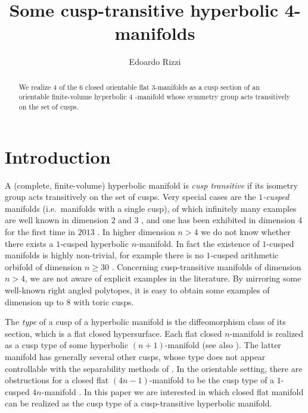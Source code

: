 \documentclass{amsart}
\author{Edoardo Rizzi}
\title{Some cusp-transitive hyperbolic 4-manifolds}
\theoremstyle{definition}
\theoremstyle{remark}
\begin{document}
\begin{abstract}
We realize 4 of the 6 closed orientable flat 3-manifolds as a cusp section of an orientable finite-volume hyperbolic 4
-manifold whose symmetry group acts transitively on the set of cusps.
\end{abstract}

\maketitle

\section{Introduction}

A (complete, finite-volume)
hyperbolic manifold is \emph{cusp transitive} if its isometry group acts transitively on the set of cusps. Very special cases are the \emph{$1$-cusped} manifolds (i.e.~manifolds with a single cusp), of which infinitely many examples are well known in dimension $2$ and $3$%
, and one has been exhibited in dimension 4 for the first time in $2013$ \cite{KM}. %
In higher dimension $n > 4$ we do not know whether there exists a $1$-cusped hyperbolic $n$-manifold. In fact the existence of $1$-cusped manifolds is highly non-trivial, for example there is no $1$-cusped arithmetic orbifold of dimension $n\ge 30$ \cite{MR3070517}. Concerning cusp-transitive manifolds of dimension $n>4$, we are not aware of explicit examples in the literature. By mirroring some well-known right angled polytopes, it is easy to obtain some examples of dimension up to $8$ with toric cusps.

The \emph{type} of a cusp of a hyperbolic manifold is the diffeomorphism class of its section, which is a flat closed hypersurface. Each flat closed $n$-manifold is realized as a cusp type of some hyperbolic $(n+1)$-manifold \cite{MR2525031} (see also \cite{N,LR2,M}). The latter manifold has generally several other cusps, whose type does not appear controllable with the separability methods of \cite{N,LR2,M,MR2525031}. In the orientable setting, there are obstructions for a closed flat $(4n-1)$-manifold to be the cusp type of a $1$-cusped $4n$-manifold \cite{LR}. In this paper we are interested in which closed flat manifold can be realized as the cusp type of a cusp-transitive hyperbolic manifold.
\end{document}
